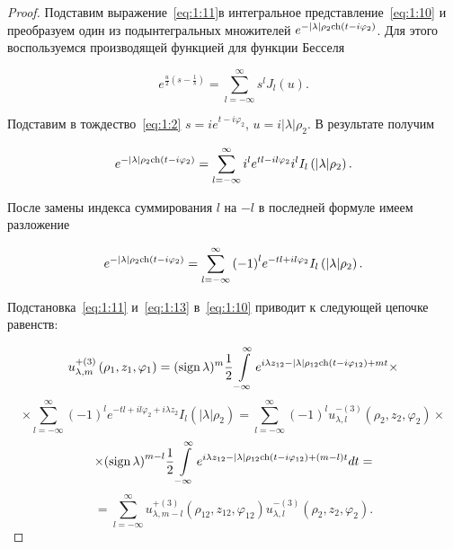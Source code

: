 \begin{russian}
\begin{proof}
Подставим выражение~\eqref{eq:1:11}в интегральное представление~\eqref{eq:1:10} и преобразуем один из подынтегральных множителей ${e^{ - |\lambda |{\rho _2}{\mathop{\rm ch}\nolimits} (t - i{\varphi _2})}}$. Для этого воспользуемся производящей функцией для функции Бесселя~\cite{Lebedev}

\begin{equation}
{e^{\frac{u}{2}\left( {s - \frac{1}{s}} \right)}} = \sum\limits_{l =  - \infty }^\infty  {{s^l}} {J_l}(u).
\end{equation}

Подставим в тождество~\eqref{eq:1:2} $s = i{e^{t - i{\varphi _2}}}$, $u = i|\lambda |{\rho _2}$. В результате получим

\begin{equation}\nonumber
{e^{ - |\lambda |{\rho _2}{\mathop{\rm ch}\nolimits} \left( {t - i{\varphi _2}} \right)}} = \sum\limits_{l =  - \infty }^\infty  {{i^l}} {e^{tl - il{\varphi _2}}}{i^l}{I_l}\left( {|\lambda |{\rho _2}} \right).
\end{equation}

После замены индекса суммирования $l$ на $-l$ в последней формуле имеем разложение

\begin{equation}\label{eq:1:13}
{e^{ - |\lambda |{\rho _2}{\mathop{\rm ch}\nolimits} \left( {t - i{\varphi _2}} \right)}} = \sum\limits_{l =  - \infty }^\infty  {{{( - 1)}^l}} {e^{ - tl + il{\varphi _2}}}{I_l}\left( {|\lambda |{\rho _2}} \right).
\end{equation}

Подстановка~\eqref{eq:1:11} и~\eqref{eq:1:13} в~\eqref{eq:1:10} приводит к следующей цепочке равенств:

\[u_{\lambda ,m}^{ + (3)}\left( {{\rho _1},{z_1},{\varphi _1}} \right) = {({\rm{sign}}{\mkern 1mu} {\kern 1pt} \lambda )^m}\frac{1}{2}\int\limits_{ - \infty }^\infty  {{e^{i\lambda {z_{12}} - |\lambda |{\rho _{12}}{\mathop{\rm ch}\nolimits} \left( {t - i{\varphi _{12}}} \right) + mt}}}  \times \]
\[ \times \sum\limits_{l =  - \infty }^\infty  {{{( - 1)}^l}} {e^{ - tl + il{\varphi _2} + i\lambda {z_2}}}{I_l}\left( {|\lambda |{\rho _2}} \right) = \sum\limits_{l =  - \infty }^\infty  {{{( - 1)}^l}} u_{\lambda ,l}^{ - (3)}\left( {{\rho _2},{z_2},{\varphi _2}} \right) \times \]
\[ \times {\left( {{\rm{sign}}{\mkern 1mu} {\kern 1pt} \lambda } \right)^{m - l}}\frac{1}{2}\int\limits_{ - \infty }^\infty  {{e^{i\lambda {z_{12}} - |\lambda |{\rho _{12}}{\mathop{\rm ch}\nolimits} \left( {t - i{\varphi _{12}}} \right) + (m - l)t}}} dt = \]
\begin{equation}
= \sum\limits_{l =  - \infty }^\infty  {u_{\lambda ,m - l}^{ + (3)}} \left( {{\rho _{12}},{z_{12}},{\varphi _{12}}} \right)u_{\lambda ,l}^{ - (3)}\left( {{\rho _2},{z_2},{\varphi _2}} \right).
\end{equation}


\end{proof}
\end{russian}
